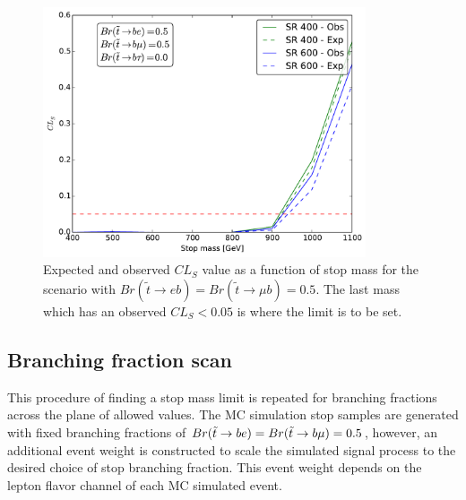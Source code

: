 \begin{figure}[ht]
  \centering
  \includegraphics[width=0.85\textwidth]
  {figs/blstop/cls_plots/cls_vs_m_br_e_50_br_m_50_br_t_0.pdf}
  \caption[
    Expected and observed $CL_S$ value as a function of stop mass for
    the scenario with $Br(\tilde{t} \to eb) = Br(\tilde{t} \to \mu b) = 0.5$.
  ]{
    Expected and observed $CL_S$ value as a function of stop mass for
    the scenario with $Br(\tilde{t} \to eb) = Br(\tilde{t} \to \mu b) = 0.5$.
    The last mass which has an observed $CL_S < 0.05$ is where the limit is to
    be set.
  }
  \label{fig:exp_limit_br_5050}
\end{figure}

\subsection{Branching fraction scan}
\label{sec:branching_fraction_scan}

This procedure of finding a stop mass limit is repeated for branching fractions
across the plane of allowed values.
The MC simulation stop samples are generated with fixed branching
fractions of $Br(\tilde{t} \rightarrow be) = Br(\tilde{t} \rightarrow b\mu) = 0.5$, however, an
additional event weight is constructed to scale the simulated signal
process to the desired choice of stop branching fraction.
This event weight depends on the lepton flavor channel of each MC simulated
event.

